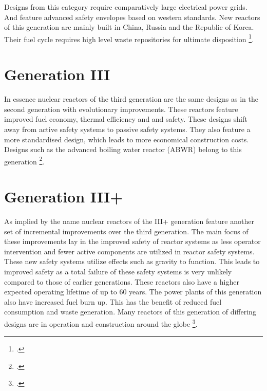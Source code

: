 Designs from this category require comparatively large electrical power grids. And feature advanced
safety envelopes based on western standards. New reactors of this generation are mainly built in
China, Russia and the Republic of Korea. Their fuel cycle requires high level waste repositories
for ultimate disposition \footcite[4-6]{Gen2gen}.
\section{Generation III}
In essence nuclear reactors of the third generation are the same designs as in the second generation
with evolutionary improvements. These reactors feature improved fuel economy, thermal efficiency and
and safety. These designs shift away from active safety systems to passive safety systems. They also
feature a more standardised design, which leads to more economical construction costs. Designs such
as the advanced boiling water reactor (ABWR) belong to this generation \footcite[5,6]{Gen2gen}.
\section{Generation III+}
As implied by the name nuclear reactors of the III+ generation feature another set of incremental improvements over the third
generation. The main focus of these improvements lay in the improved safety of reactor systems as
less operator intervention and fewer active components are utilized in reactor safety systems. These
new safety systems utilize effects such as gravity to function. This leads to improved safety as a
total failure of these safety systems is very unlikely compared to those of earlier generations.
These reactors also have a higher expected operating lifetime of up to 60 years. The power plants of
this generation also have increased fuel burn up. This has the benefit of reduced fuel consumption
and waste generation. Many reactors of this generation of differing designs are in operation
and construction around the globe \footcite[7-11]{Gen2gen}.